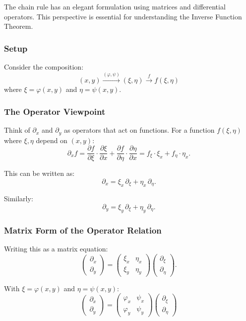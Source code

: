 \documentclass[11pt]{report}
\begin{document}
The chain rule has an elegant formulation using matrices and differential operators. This perspective is essential for understanding the Inverse Function Theorem.

\subsubsection*{Setup}

Consider the composition:
\[
(x, y) \xrightarrow{(\varphi, \psi)} (\xi, \eta) \xrightarrow{f} f(\xi, \eta)
\]
where $\xi = \varphi(x, y)$ and $\eta = \psi(x, y)$.

\subsubsection*{The Operator Viewpoint}

Think of $\partial_x$ and $\partial_y$ as operators that act on functions. For a function $f(\xi, \eta)$ where $\xi, \eta$ depend on $(x, y)$:
\[
\partial_x f = \frac{\partial f}{\partial \xi} \cdot \frac{\partial \xi}{\partial x} + \frac{\partial f}{\partial \eta} \cdot \frac{\partial \eta}{\partial x} = f_\xi \cdot \xi_x + f_\eta \cdot \eta_x.
\]

This can be written as:
\[
\partial_x = \xi_x \, \partial_\xi + \eta_x \, \partial_\eta.
\]

Similarly:
\[
\partial_y = \xi_y \, \partial_\xi + \eta_y \, \partial_\eta.
\]

\subsubsection*{Matrix Form of the Operator Relation}

Writing this as a matrix equation:
\[
\begin{pmatrix} \partial_x \\ \partial_y \end{pmatrix} = \begin{pmatrix} \xi_x & \eta_x \\ \xi_y & \eta_y \end{pmatrix} \begin{pmatrix} \partial_\xi \\ \partial_\eta \end{pmatrix}.
\]

With $\xi = \varphi(x,y)$ and $\eta = \psi(x,y)$:
\[
\boxed{\begin{pmatrix} \partial_x \\ \partial_y \end{pmatrix} = \begin{pmatrix} \varphi_x & \psi_x \\ \varphi_y & \psi_y \end{pmatrix} \begin{pmatrix} \partial_\xi \\ \partial_\eta \end{pmatrix}}
\]
\end{document}
